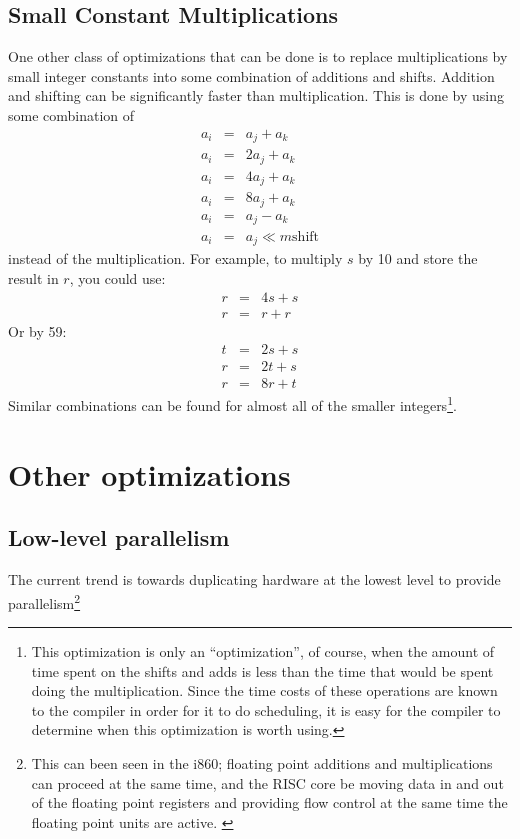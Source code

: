 \subsection{Small Constant Multiplications}

One other class of optimizations that can be done is to replace
multiplications by small integer constants into some combination of
additions and shifts.  Addition and shifting can be significantly faster
than multiplication.  This is done by using some combination of
\begin{eqnarray*}
a_i & = & a_j + a_k \\
a_i & = & 2a_j + a_k \\
a_i & = & 4a_j + a_k \\
a_i & = & 8a_j + a_k \\
a_i & = & a_j - a_k \\
a_i & = & a_j \ll m \mbox{shift}
\end{eqnarray*}
instead of the multiplication.  For example, to multiply $s$ by 10 and store
the result in $r$, you could use:
\begin{eqnarray*}
r & = & 4s + s\\
r & = & r + r
\end{eqnarray*}
Or by 59:
\begin{eqnarray*}
t & = & 2s + s \\
r & = & 2t + s \\
r & = & 8r + t
\end{eqnarray*}
Similar combinations can be found for almost all of the smaller
integers\footnote{This optimization is only an ``optimization'', of course,
when the amount of time spent on the shifts and adds is less than the time
that would be spent doing the multiplication.  Since the time costs of these
operations are known to the compiler in order for it to do scheduling, it is
easy for the compiler to determine when this optimization is worth using.}.
\cite{magenheimer:precision}

\section{Other optimizations}

\subsection{Low-level parallelism}

The current trend is towards duplicating hardware at the lowest level to
provide parallelism\footnote{This can been seen in the i860; floating point
additions and multiplications can proceed at the same time, and the RISC
core be moving data in and out of the floating point registers and providing
flow control at the same time the floating point units are active. \cite{byte:i860}}

